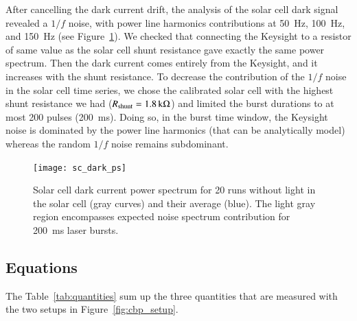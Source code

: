 
After cancelling the dark current drift, the analysis of the solar cell dark signal revealed a $1/f$ noise, with power line harmonics contributions at \SI{50}{\hertz},  \SI{100}{\hertz}, and \SI{150}{\hertz} (see Figure~\ref{fig:darkcurrentspectrum}). 
We checked that connecting the Keysight to a resistor of same value as the solar cell shunt resistance gave exactly the same
power spectrum. Then the dark current comes entirely from the Keysight, and it increases with the shunt resistance. To decrease the contribution of the $1/f$ noise in the solar cell time series, we chose the calibrated solar cell with the highest shunt resistance we had ($R_{\rm shunt} = \SI{1.8}{\kilo\ohm}$) and limited the burst durations to at most 200 pulses (\SI{200}{\ms}). Doing so, in the burst time window, the Keysight noise is dominated by the power line harmonics (that can be analytically model) whereas the random $1/f$ noise remains subdominant.




\begin{figure}[h]
\begin{center}
\texttt{[image: sc\_dark\_ps]}
\end{center}
\caption[]{Solar cell dark current power spectrum for 20 runs without light in the solar cell (gray curves) and their average (blue). The light gray region encompasses expected noise spectrum contribution for \SI{200}{\ms} laser bursts.}
\label{fig:darkcurrentspectrum}
\end{figure}

\FloatBarrier   

\subsection{Equations}


The Table~\ref{tab:quantities} sum up the three quantities that are measured with the two setups in Figure~\ref{fig:cbp_setup}.

